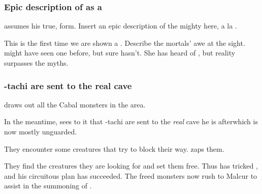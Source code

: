 \begin{garbage}
\subsubsection{Epic description of \Ishnaruchaefir{} as a \dragon}
\Ishnaruchaefir{} assumes his true, \draconian{} form. Insert an epic description of the mighty \dragon{} here, a la . 

This is the first time we are shown a \dragon. 
Describe the mortals' awe at the sight. 
\Dzasselid{} might have seen one before, but \Shilred{} sure hasn't. 
She has heard  of \dragons{}, but reality surpasses the myths. 





\subsubsection{\Dzasselid-tachi are sent to the real cave}
\Ishnaruchaefir{} draws out all the Cabal monsters in the area. 

In the meantime, \Criseis{} sees to it that \Dzasselid-tachi are sent to the \emph{real} cave he is after\dash which is now mostly unguarded. 

They encounter some creatures that try to block their way. 
\Criseis{} zaps them.


They find the creatures they are looking for and set them free. Thus \Ishnaruchaefir{} has tricked \Teshrial{}, and his circuitous plan has succeeded. The freed monsters now rush to Malcur to assist in the summoning of \Nithdornazsh. 


\end{garbage}

